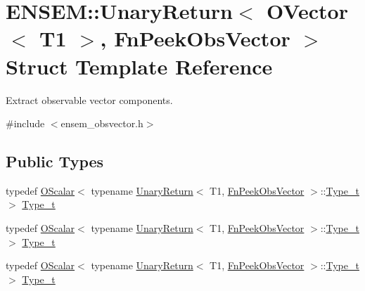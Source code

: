 \hypertarget{structENSEM_1_1UnaryReturn_3_01OVector_3_01T1_01_4_00_01FnPeekObsVector_01_4}{}\section{E\+N\+S\+EM\+:\+:Unary\+Return$<$ O\+Vector$<$ T1 $>$, Fn\+Peek\+Obs\+Vector $>$ Struct Template Reference}
\label{structENSEM_1_1UnaryReturn_3_01OVector_3_01T1_01_4_00_01FnPeekObsVector_01_4}


Extract observable vector components.  




{\ttfamily \#include $<$ensem\+\_\+obsvector.\+h$>$}

\subsection*{Public Types}
\begin{DoxyCompactItemize}
\item 
typedef \mbox{\hyperlink{classENSEM_1_1OScalar}{O\+Scalar}}$<$ typename \mbox{\hyperlink{structENSEM_1_1UnaryReturn}{Unary\+Return}}$<$ T1, \mbox{\hyperlink{structENSEM_1_1FnPeekObsVector}{Fn\+Peek\+Obs\+Vector}} $>$\+::\mbox{\hyperlink{structENSEM_1_1UnaryReturn_3_01OVector_3_01T1_01_4_00_01FnPeekObsVector_01_4_a389e8e049203dcaaa7ef75769364c944}{Type\+\_\+t}} $>$ \mbox{\hyperlink{structENSEM_1_1UnaryReturn_3_01OVector_3_01T1_01_4_00_01FnPeekObsVector_01_4_a389e8e049203dcaaa7ef75769364c944}{Type\+\_\+t}}
\item 
typedef \mbox{\hyperlink{classENSEM_1_1OScalar}{O\+Scalar}}$<$ typename \mbox{\hyperlink{structENSEM_1_1UnaryReturn}{Unary\+Return}}$<$ T1, \mbox{\hyperlink{structENSEM_1_1FnPeekObsVector}{Fn\+Peek\+Obs\+Vector}} $>$\+::\mbox{\hyperlink{structENSEM_1_1UnaryReturn_3_01OVector_3_01T1_01_4_00_01FnPeekObsVector_01_4_a389e8e049203dcaaa7ef75769364c944}{Type\+\_\+t}} $>$ \mbox{\hyperlink{structENSEM_1_1UnaryReturn_3_01OVector_3_01T1_01_4_00_01FnPeekObsVector_01_4_a389e8e049203dcaaa7ef75769364c944}{Type\+\_\+t}}
\item 
typedef \mbox{\hyperlink{classENSEM_1_1OScalar}{O\+Scalar}}$<$ typename \mbox{\hyperlink{structENSEM_1_1UnaryReturn}{Unary\+Return}}$<$ T1, \mbox{\hyperlink{structENSEM_1_1FnPeekObsVector}{Fn\+Peek\+Obs\+Vector}} $>$\+::\mbox{\hyperlink{structENSEM_1_1UnaryReturn_3_01OVector_3_01T1_01_4_00_01FnPeekObsVector_01_4_a389e8e049203dcaaa7ef75769364c944}{Type\+\_\+t}} $>$ \mbox{\hyperlink{structENSEM_1_1UnaryReturn_3_01OVector_3_01T1_01_4_00_01FnPeekObsVector_01_4_a389e8e049203dcaaa7ef75769364c944}{Type\+\_\+t}}
\end{DoxyCompactItemize}


